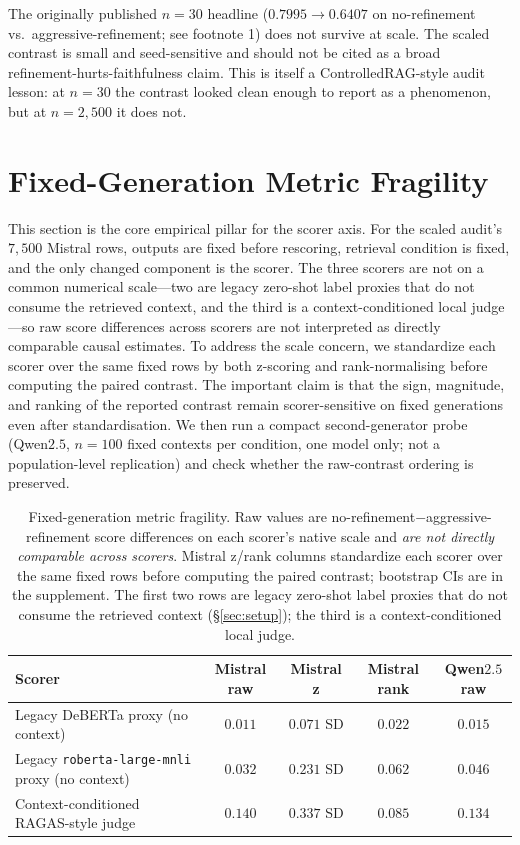 The originally published $n=30$ headline ($0.7995 \to 0.6407$ on
no-refinement vs.\ aggressive-refinement; see footnote 1) does not
survive at scale. The scaled contrast is small and seed-sensitive
and should not be cited as a broad refinement-hurts-faithfulness
claim. This is itself a ControlledRAG-style audit lesson: at $n=30$
the contrast looked clean enough to report as a phenomenon, but at
$n=2{,}500$ it does not.

\section{Fixed-Generation Metric Fragility}
\label{sec:metric_fragility}

This section is the core empirical pillar for the scorer axis. For the
scaled audit's $7{,}500$ Mistral rows, outputs are fixed before
rescoring, retrieval condition is fixed, and the only changed
component is the scorer. The three scorers are not on a common
numerical scale---two are legacy zero-shot label proxies that do not
consume the retrieved context, and the third is a context-conditioned
local judge---so raw score differences across scorers are not
interpreted as directly comparable causal estimates. To address the
scale concern, we standardize each scorer over the same fixed rows by
both z-scoring and rank-normalising before computing the paired
contrast. The important claim is that the sign, magnitude, and ranking
of the reported contrast remain scorer-sensitive on fixed generations
even after standardisation. We then run a compact second-generator probe (Qwen$2.5$, $n=100$
fixed contexts per condition, one model only; not a population-level
replication) and check whether the raw-contrast ordering is
preserved.

\begin{table}[!htb]
\centering
\caption{Fixed-generation metric fragility. Raw values are
no-refinement$-$aggressive-refinement score differences on each
scorer's native scale and \emph{are not directly comparable across
scorers}. Mistral z/rank columns standardize each scorer over the
same fixed rows before computing the paired contrast; bootstrap CIs
are in the supplement. The first two rows are legacy zero-shot label
proxies that do not consume the retrieved context (\S\ref{sec:setup});
the third is a context-conditioned local judge.}
\label{tab:metric_fragility_main}
\footnotesize
\begin{tabular}{lcccc}
\toprule
Scorer & Mistral raw & Mistral z & Mistral rank & Qwen$2.5$ raw \\
\midrule
Legacy DeBERTa proxy (no context) & $0.011$ & $0.071$ SD & $0.022$ & $0.015$ \\
Legacy \texttt{roberta-large-mnli} proxy (no context) & $0.032$ & $0.231$ SD & $0.062$ & $0.046$ \\
Context-conditioned RAGAS-style judge & $0.140$ & $0.337$ SD & $0.085$ & $0.134$ \\
\bottomrule
\end{tabular}
\end{table}


